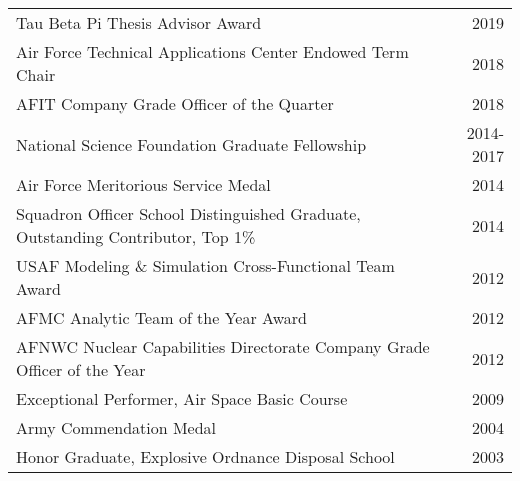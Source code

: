 \begin{tabular}{ @{} l @{\hspace{6ex}} r }
Tau Beta Pi Thesis Advisor Award & 2019 \\
Air Force Technical Applications Center Endowed Term Chair & 2018\\
AFIT Company Grade Officer of the Quarter & 2018 \\
National Science Foundation Graduate Fellowship & 2014-2017 \\
Air Force Meritorious Service Medal & 2014 \\
Squadron Officer School Distinguished Graduate, Outstanding Contributor, Top 1\% & 2014 \\
USAF Modeling \& Simulation Cross-Functional Team Award & 2012 \\
AFMC Analytic Team of the Year Award & 2012 \\
AFNWC Nuclear Capabilities Directorate Company Grade Officer of the Year & 2012 \\
Exceptional Performer, Air Space Basic Course & 2009 \\
Army Commendation Medal & 2004 \\
Honor Graduate, Explosive Ordnance Disposal School & 2003 \\
\end{tabular}